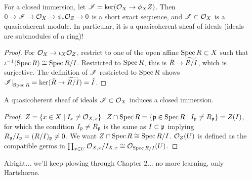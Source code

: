 \begin{theorem} \label{thm:closed_immersion_induces_qc_sheaf_of_ideals}
    For a closed immersion, let $\mathscr I = \ker(\mathcal O_X \to \phi_X Z)$. Then $0 \to \mathscr I \to \mathcal O_X \to \phi_\ast \mathcal O_Z \to 0$ is a short exact sequence, and $\mathscr I \subset \mathcal O_X$ is a quasicoherent module. In particular, it is a quasicoherent sheaf of ideals (ideals are submodules of a ring)! 
\end{theorem}
\begin{proof}
    For $\mathcal O_X \to \iota_X \mathcal O_Z$, restrict to one of the open affine $\operatorname{Spec} R \subset X$ such that $\iota^{-1}(\operatorname{Spec} R) \cong \operatorname{Spec} R /I$. Restricted to $\operatorname{Spec} R$, this is $\tilde R \to \widetilde{R/I}$, which is surjective. The definition of $\mathscr I$ restricted to $\operatorname{Spec} R$ shows $\restr{\SCI}{\Spec R} = \ker(\tilde R \to \wt{R/I}) = \tilde I$.
\end{proof}

\begin{theorem} \label{thm:qc_sheaf_of_ideals_induces_closed_immersion}
    A quasicoherent sheaf of ideals $\mathscr I \subset \mathcal O_X$ induces a closed immersion.
\end{theorem}
\begin{proof}
    $Z = \{x \in X \mid I_x \neq \mathcal O_{X,x}\}$. $Z \cap \operatorname{Spec} R = \{\mathfrak p \in \operatorname{Spec} R \mid I_\mathfrak p \neq R_\mathfrak p\} = Z(I)$, for which the condition $I_\mathfrak p \neq R_\mathfrak p$ is the same as $I \subset \mathfrak p$ implying $R_\mathfrak p/I_\mathfrak p = (R/I)_{\mathfrak p} \neq 0$. We want $Z \cap \operatorname{Spec} R \cong \operatorname{Spec} R/I$. $\mathcal O_Z(U)$ is defined as the compatible germs in $\prod_{x \in U} \mathcal O_{X,x} / I_{X,x} \cong \mathcal O_{\operatorname{Spec} R/I}(U)$.
\end{proof}

{\color{amethyst} Alright... we'll keep plowing through Chapter 2... no more learning, only Hartshorne.}
